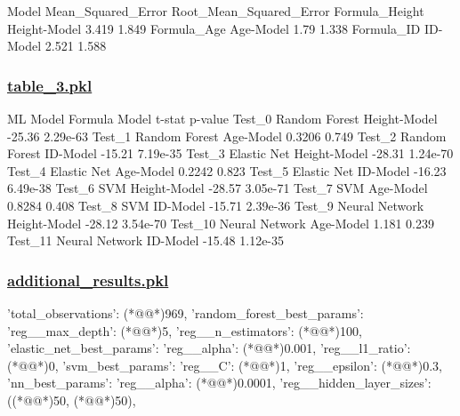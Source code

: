 \documentclass[11pt]{article}
\begin{document}
\begin{codeoutput}
                       Model  Mean\_Squared\_Error  Root\_Mean\_Squared\_Error
Formula\_Height  Height-Model               3.419                    1.849
Formula\_Age        Age-Model                1.79                    1.338
Formula\_ID          ID-Model               2.521                    1.588
\end{codeoutput}\hypertarget{file-table-3-pkl}{}

\subsubsection*{\hyperlink{code-Data Analysis-table-3-pkl}{table\_3.pkl}}

\begin{codeoutput}
               ML Model Formula Model  t-stat   p-value
Test\_0    Random Forest  Height-Model  -25.36  2.29e-63
Test\_1    Random Forest     Age-Model  0.3206     0.749
Test\_2    Random Forest      ID-Model  -15.21  7.19e-35
Test\_3      Elastic Net  Height-Model  -28.31  1.24e-70
Test\_4      Elastic Net     Age-Model  0.2242     0.823
Test\_5      Elastic Net      ID-Model  -16.23  6.49e-38
Test\_6              SVM  Height-Model  -28.57  3.05e-71
Test\_7              SVM     Age-Model  0.8284     0.408
Test\_8              SVM      ID-Model  -15.71  2.39e-36
Test\_9   Neural Network  Height-Model  -28.12  3.54e-70
Test\_10  Neural Network     Age-Model   1.181     0.239
Test\_11  Neural Network      ID-Model  -15.48  1.12e-35
\end{codeoutput}\hypertarget{file-additional-results-pkl}{}

\subsubsection*{\hyperlink{code-Data Analysis-additional-results-pkl}{additional\_results.pkl}}

\begin{codeoutput}
{
    'total\_observations': (*@@*)969,
    'random\_forest\_best\_params': {'reg\_\_max\_depth': (*@@*)5, 'reg\_\_n\_estimators': (*@@*)100},
    'elastic\_net\_best\_params': {'reg\_\_alpha': (*@@*)0.001, 'reg\_\_l1\_ratio': (*@@*)0},
    'svm\_best\_params': {'reg\_\_C': (*@@*)1, 'reg\_\_epsilon': (*@@*)0.3},
    'nn\_best\_params': {'reg\_\_alpha': (*@@*)0.0001, 'reg\_\_hidden\_layer\_sizes': ((*@@*)50, (*@@*)50)},
}
\end{codeoutput}
\end{document}
